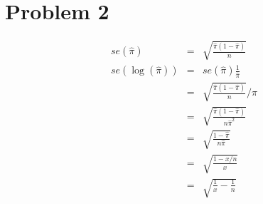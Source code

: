 \documentclass{article}\usepackage[]{graphicx}\usepackage[]{color}
\begin{document}
\section{Problem 2}

\begin{eqnarray*}
se(\hat\pi) &=& \sqrt{\frac{\hat\pi (1-\hat\pi)}{n}}\\
se(\log(\hat\pi)) &=& se(\hat\pi) \frac{1}{\hat\pi}\\
&=& \sqrt{\frac{\hat\pi (1-\hat\pi)}{n}} / \hat\pi\\
&=& \sqrt{\frac{\hat\pi (1-\hat\pi)}{n \hat\pi^2}}\\
&=& \sqrt{\frac{1 - \hat\pi}{n \hat\pi}}\\
&=& \sqrt{\frac{1 - x/n}{x}}\\
&=& \sqrt{\frac{1}{x}-\frac{1}{n}}
\end{eqnarray*}
\end{document}
